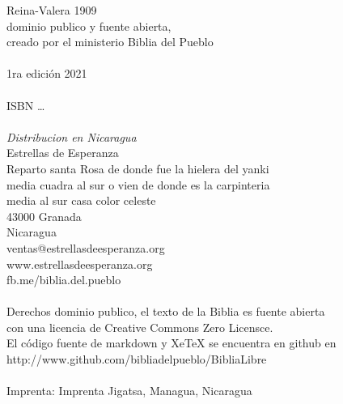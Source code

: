 Reina-Valera 1909\\
dominio publico y fuente abierta,\\
creado por el ministerio Biblia del Pueblo\\
~\\
1ra edición 2021\\
~\\
ISBN \dots\\
~\\
\emph{Distribucion en Nicaragua}\\
Estrellas de Esperanza\\
Reparto santa Rosa de donde fue la hielera del yanki\\
media cuadra al sur o vien de donde es la carpinteria\\
media al sur casa color celeste\\
43000 Granada\\
Nicaragua\\
ventas@estrellasdeesperanza.org\\
www.estrellasdeesperanza.org\\
fb.me/biblia.del.pueblo\\
~\\
Derechos dominio publico, el texto de la Biblia es fuente abierta\\
con una licencia de Creative Commons Zero Licensce.\\
El código fuente de markdown y XeTeX se encuentra en github en\\
http://www.github.com/bibliadelpueblo/BibliaLibre\\
~\\
Imprenta: Imprenta Jigatsa, Managua, Nicaragua\\
